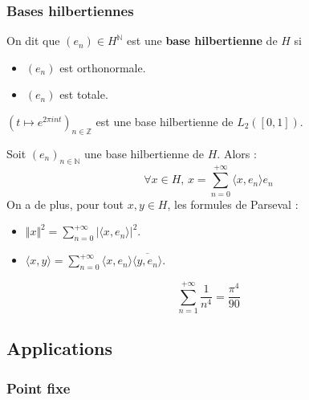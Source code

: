  \subsubsection{Bases hilbertiennes}


  \begin{definition}
    On dit que $(e_n) \in H^{\mathbb{N}}$ est une \textbf{base hilbertienne} de $H$ si
    \begin{itemize}
      \item $(e_n)$ est orthonormale.
      \item $(e_n)$ est totale.
    \end{itemize}
  \end{definition}

  \begin{example}
    $(t \mapsto e^{2\pi int})_{n \in \mathbb{Z}}$ est une base hilbertienne de $L_2([0,1])$.
  \end{example}

  \begin{theorem}
    Soit $(e_n)_{n \in \mathbb{N}}$ une base hilbertienne de $H$. Alors :
    \[ \forall x \in H, \, x = \sum_{n=0}^{+\infty} \langle x, e_n \rangle e_n \]
    On a de plus, pour tout $x, y \in H$, les formules de Parseval :
    \begin{itemize}
      \item $\Vert x \Vert^2 = \sum_{n=0}^{+\infty} \vert \langle x, e_n \rangle \vert^2$.
      \item $\langle x, y \rangle = \sum_{n=0}^{+\infty} \langle x, e_n \rangle \overline{\langle y, e_n \rangle}$.
    \end{itemize}
  \end{theorem}


  \begin{application}
    \[ \sum_{n = 1}^{+\infty} \frac{1}{n^4} = \frac{\pi^4}{90} \]
  \end{application}

  \subsection{Applications}

  \subsubsection{Point fixe}


